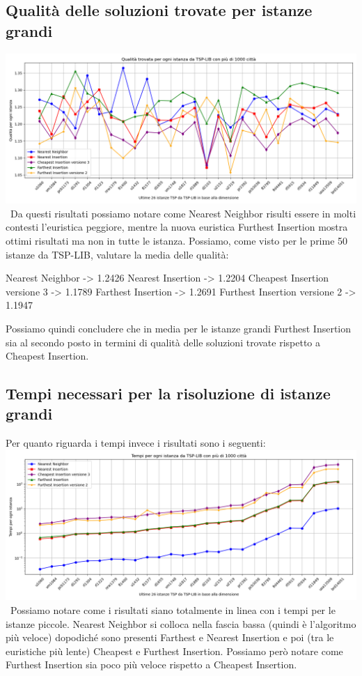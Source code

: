 \documentclass[a4paper,12pt]{report}
\begin{document}
\subsection{Qualità delle soluzioni trovate per istanze grandi}
\includegraphics[width=1\textwidth]{../Grafici/18.png} \
Da questi risultati possiamo notare come Nearest Neighbor risulti essere in molti contesti l'euristica peggiore, mentre la nuova euristica Furthest Insertion mostra ottimi risultati ma non in tutte le istanza. Possiamo, come visto per le prime 50 istanze da TSP-LIB, valutare la media delle qualità:
\begin{myverbatim}
Nearest Neighbor ->              1.2426
Nearest Insertion ->             1.2204
Cheapest Insertion versione 3 -> 1.1789
Farthest Insertion ->            1.2691
Furthest Insertion versione 2 -> 1.1947
\end{myverbatim}
Possiamo quindi concludere che in media per le istanze grandi Furthest Insertion sia al secondo posto in termini di qualità delle soluzioni trovate rispetto a Cheapest Insertion.
\subsection{Tempi necessari per la risoluzione di istanze grandi}
Per quanto riguarda i tempi invece i risultati sono i seguenti: \newline
\includegraphics[width=1\textwidth]{../Grafici/19.png} \
Possiamo notare come i risultati siano totalmente in linea con i tempi per le istanze piccole. Nearest Neighbor si colloca nella fascia bassa (quindi è l'algoritmo più veloce) dopodiché sono presenti Farthest e Nearest Insertion e poi (tra le euristiche più lente) Cheapest e Furthest Insertion. Possiamo però notare come Furthest Insertion sia poco più veloce rispetto a Cheapest Insertion.
\end{document}
